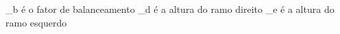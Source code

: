 \documentclass[preview]{standalone}
\begin{document}
\begin{center}
_b é o fator de balanceamento _d é a altura do ramo direito _e é a altura do ramo esquerdo
\end{center}
\end{document}
